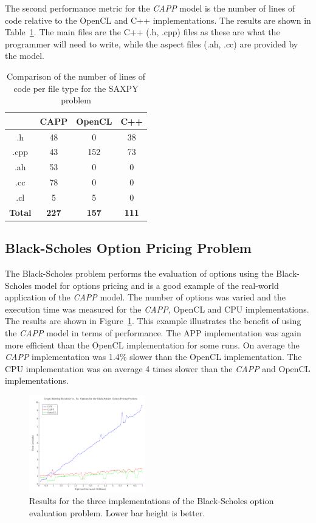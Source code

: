 \documentclass{sig-alternate-05-2015}
\begin{document}
The second performance metric for the \textit{CAPP} model is the number of lines
of code relative to the OpenCL and C++ implementations. The results are shown in 
Table~\ref{tab:saxpy}. The main files are the C++ (.h, .cpp) files as these are
what the programmer will need to write, while the aspect files (.ah, .cc) are
provided by the  model. 

\begin{table}[!b]
\centering
\caption{Comparison of the number of lines of code per file type for the SAXPY
problem }
\label{tab:saxpy}
\begin{tabular}{|c|c|c|c|} 
	\hline
				& CAPP			& OpenCL		& C++	\\ \hline
.h				& 48			& 0				& 38	\\ \hline
.cpp			& 43			& 152			& 73	\\ \hline
.ah				& 53			& 0				& 0		\\ \hline
.cc				& 78			& 0				& 0		\\ \hline
.cl				& 5				& 5				& 0		\\ \hline
\textbf{Total}	& \textbf{227}	& \textbf{157}	& \textbf{111}		\\ \hline		
\hline
\end{tabular}
\end{table}

\subsection{Black-Scholes Option Pricing Problem}

The Black-Scholes problem performs the evaluation of options using the
Black-Scholes model for options pricing and is a good example of the real-world
application of the \textit{CAPP} model. The number of options was varied and the
execution time was measured for the \textit{CAPP}, OpenCL and CPU implementations.
The results are shown in Figure~\ref{fig:blackscholes}. This example illustrates
the benefit of using the \textit{CAPP} model in terms of performance. The APP
implementation was again more efficient than the OpenCL implementation for some
runs. On average the \textit{CAPP} implementation was 1.4\% slower than the
OpenCL implementation. The CPU implementation was on average 4 times slower than
the \textit{CAPP} and OpenCL implementations. 

\begin{figure}[!t]
	\centering
	\includegraphics[width=0.45\textwidth]{BlackScholes}
	\caption{Results for the three implementations of the Black-Scholes option
		evaluation problem. Lower
	bar height is better.}
	\label{fig:blackscholes}
\end{figure}
\end{document}
